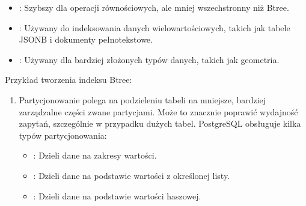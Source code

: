 \documentclass[letterpaper,10pt,polish]{sphinxmanual}
\begin{document}
\begin{enumerate}
\begin{itemize}
\item {} 
\sphinxAtStartPar
{}: Szybszy dla operacji równościowych, ale mniej wszechstronny niż B\sphinxhyphen{}tree.

\item {} 
\sphinxAtStartPar
{}: Używany do indeksowania danych wielowartościowych, takich jak tabele JSONB i dokumenty pełnotekstowe.

\item {} 
\sphinxAtStartPar
{}: Używany dla bardziej złożonych typów danych, takich jak geometria.

\end{itemize}

\end{enumerate}

\sphinxAtStartPar
Przykład tworzenia indeksu B\sphinxhyphen{}tree:

\sphinxAtStartPar
{}
\begin{enumerate}
%
\setcounter{enumi}{3}
\item {} 
\sphinxAtStartPar
{} \sphinxhyphen{} Partycjonowanie polega na podzieleniu tabeli na mniejsze, bardziej zarządzalne części zwane partycjami. Może to znacznie poprawić wydajność zapytań, szczególnie w przypadku dużych tabel. PostgreSQL obsługuje kilka typów partycjonowania:
\begin{itemize}
\item {} 
\sphinxAtStartPar
{}: Dzieli dane na zakresy wartości.

\item {} 
\sphinxAtStartPar
{}: Dzieli dane na podstawie wartości z określonej listy.

\item {} 
\sphinxAtStartPar
{}: Dzieli dane na podstawie wartości haszowej.

\end{itemize}

\end{enumerate}
\end{document}
